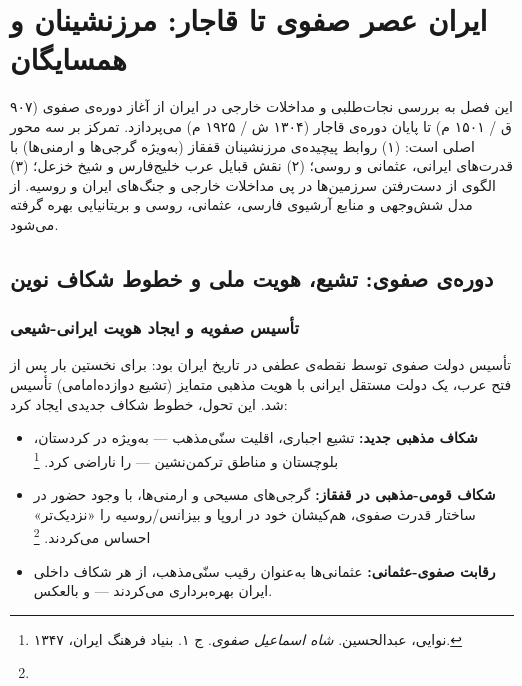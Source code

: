 \chapter{ایران عصر صفوی تا قاجار: مرزنشینان و همسایگان}
\label{ch:early-modern-iran}

\begin{tcolorbox}[mybox, title={چکیده‌ی فصل}]
این فصل به بررسی نجات‌طلبی و مداخلات خارجی در ایران از آغاز دوره‌ی صفوی (۹۰۷ ق / ۱۵۰۱ م) تا پایان دوره‌ی قاجار (۱۳۰۴ ش / ۱۹۲۵ م) می‌پردازد. تمرکز بر سه محور اصلی است: (۱) روابط پیچیده‌ی مرزنشینان قفقاز (به‌ویژه گرجی‌ها و ارمنی‌ها) با قدرت‌های ایرانی، عثمانی و روسی؛ (۲) نقش قبایل عرب خلیج‌فارس و شیخ خزعل؛ (۳) الگوی از دست‌رفتن سرزمین‌ها در پی مداخلات خارجی و جنگ‌های ایران و روسیه. از مدل شش‌وجهی و منابع آرشیوی فارسی، عثمانی، روسی و بریتانیایی بهره گرفته می‌شود.
\end{tcolorbox}

\section{دوره‌ی صفوی: تشیع، هویت ملی و خطوط شکاف نوین}
\label{sec:ch06-safavid}

\subsection{تأسیس صفویه و ایجاد هویت ایرانی-شیعی}
\label{subsec:ch06-safavid-identity}

تأسیس دولت صفوی توسط  نقطه‌ی عطفی در تاریخ ایران بود: برای نخستین بار پس از فتح عرب، یک دولت مستقل ایرانی با هویت مذهبی متمایز (تشیع دوازده‌امامی) تأسیس شد. این تحول، خطوط شکاف جدیدی ایجاد کرد:

\begin{itemize}[nosep, rightmargin=1em]
  \item \textbf{شکاف مذهبی جدید:} تشیع اجباری، اقلیت سنّی‌مذهب — به‌ویژه در کردستان، بلوچستان و مناطق ترکمن‌نشین — را ناراضی کرد.%
  \footnote{نوایی، عبدالحسین. \textit{شاه اسماعیل صفوی}. ج ۱. بنیاد فرهنگ ایران، ۱۳۴۷.}
  \item \textbf{شکاف قومی-مذهبی در قفقاز:} گرجی‌های مسیحی و ارمنی‌ها، با وجود حضور در ساختار قدرت صفوی، هم‌کیشان خود در اروپا و بیزانس/روسیه را «نزدیک‌تر» احساس می‌کردند.%
  \footnote{}
  \item \textbf{رقابت صفوی-عثمانی:} عثمانی‌ها به‌عنوان رقیب سنّی‌مذهب، از هر شکاف داخلی ایران بهره‌برداری می‌کردند — و بالعکس.
\end{itemize}

